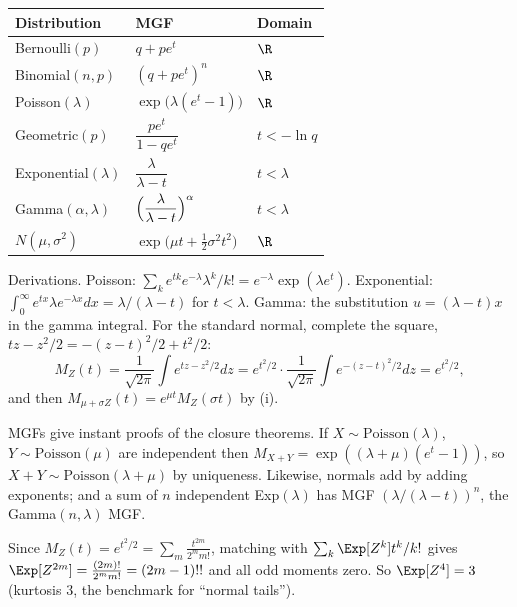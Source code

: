 \begin{center}
\begin{tabular}{@{}lll@{}}
\toprule
Distribution & MGF & Domain\\
\midrule
Bernoulli$(p)$ & $q+pe^t$ & $\R$\\
Binomial$(n,p)$ & $(q+pe^t)^n$ & $\R$\\
Poisson$(\lambda)$ & $\exp\bigl(\lambda(e^t-1)\bigr)$ & $\R$\\
Geometric$(p)$ & $\dfrac{pe^t}{1-qe^t}$ & $t<-\ln q$\\[0.5em]
Exponential$(\lambda)$ & $\dfrac\lambda{\lambda-t}$ & $t<\lambda$\\[0.5em]
Gamma$(\alpha,\lambda)$ & $\Bigl(\dfrac\lambda{\lambda-t}\Bigr)^\alpha$ & $t<\lambda$\\[0.5em]
$N(\mu,\sigma^2)$ & $\exp\bigl(\mu t+\tfrac12\sigma^2t^2\bigr)$ & $\R$\\
\bottomrule
\end{tabular}
\end{center}

Derivations. Poisson: $\sum_ke^{tk}e^{-\lambda}\lambda^k/k!=e^{-\lambda}\exp(\lambda e^t)$.
Exponential: $\int_0^\infty e^{tx}\lambda e^{-\lambda x}dx=\lambda/(\lambda-t)$ for $t<\lambda$.
Gamma: the substitution $u=(\lambda-t)x$ in the gamma integral. For the standard
normal, complete the square, $tz-z^2/2=-(z-t)^2/2+t^2/2$:
\[
M_Z(t)=\frac1{\sqrt{2\pi}}\int e^{tz-z^2/2}dz=e^{t^2/2}\cdot\frac1{\sqrt{2\pi}}\int e^{-(z-t)^2/2}dz=e^{t^2/2},
\]
and then $M_{\mu+\sigma Z}(t)=e^{\mu t}M_Z(\sigma t)$ by (i).

\begin{example}
MGFs give instant proofs of the closure theorems. If $X\sim\mathrm{Poisson}(\lambda)$,
$Y\sim\mathrm{Poisson}(\mu)$ are independent then
$M_{X+Y}=\exp((\lambda+\mu)(e^t-1))$, so $X+Y\sim\mathrm{Poisson}(\lambda+\mu)$ by uniqueness.
Likewise, normals add by adding exponents; and a sum of $n$ independent
Exp$(\lambda)$ has MGF $(\lambda/(\lambda-t))^n$, the Gamma$(n,\lambda)$ MGF.
\end{example}

\begin{example}
Since $M_Z(t)=e^{t^2/2}=\sum_m\frac{t^{2m}}{2^mm!}$, matching with
$\sum_k\Exp[Z^k]t^k/k!$ gives $\Exp[Z^{2m}]=\frac{(2m)!}{2^mm!}=(2m-1)!!$ and all
odd moments zero. So $\Exp[Z^4]=3$ (kurtosis $3$, the benchmark for ``normal
tails'').
\end{example}

